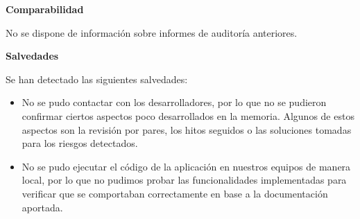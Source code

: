 \documentclass[a4paper,12pt]{report}
\begin{document}
\vspace{1cm}

\begin{center}
    {\Large \textbf{Comparabilidad}}
\end{center}

\vspace{0.5cm}
No se dispone de información sobre informes de auditoría anteriores.\\

\newpage
\begin{center}
    {\Large \textbf{Salvedades}}
\end{center}

\vspace{0.5cm}
Se han detectado las siguientes salvedades:

\begin{itemize}
    \item No se pudo contactar con los desarrolladores, por lo que no se pudieron confirmar ciertos aspectos poco desarrollados en la memoria. Algunos de estos aspectos son la revisión por pares, los hitos seguidos o las soluciones tomadas para los riesgos detectados.
    
    \item No se pudo ejecutar el código de la aplicación en nuestros equipos de manera local, por
    lo que no pudimos probar las funcionalidades implementadas para verificar que se comportaban
    correctamente en base a la documentación aportada.
\end{itemize}


\vspace{1cm}
\end{document}
